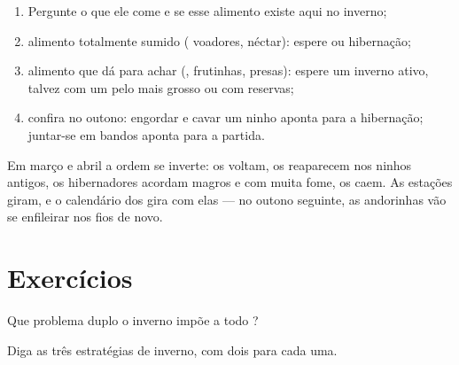 \begin{method}\label{met:g3:animals-through-seasons:guess}
\begin{enumerate}
  \item Pergunte o que ele come e se esse alimento existe aqui no
        inverno;
  \item alimento totalmente sumido ( voadores, néctar):
        espere  ou hibernação;
  \item alimento que dá para achar (, frutinhas, presas):
        espere um inverno ativo, talvez com um pelo mais grosso ou
        com reservas;
  \item confira no outono: engordar e cavar um ninho aponta para a
        hibernação; juntar-se em bandos aponta para a partida.
\end{enumerate}
\end{method}

\begin{example}\label{ex:g3:animals-through-seasons:spring}
Em março e abril a ordem se inverte: os  voltam, os
 reaparecem nos ninhos antigos, os hibernadores acordam
magros e com muita fome, os  caem. As estações
giram, e o calendário dos  gira com elas --- no outono
seguinte, as andorinhas vão se enfileirar nos fios de novo.
\end{example}

\section{Exercícios}

\begin{exercise}[$\star$]\label{exo:g3:animals-through-seasons:1}
Que problema duplo o inverno impõe a todo ?
\end{exercise}

\begin{exercise}[$\star$]\label{exo:g3:animals-through-seasons:2}
Diga as três estratégias de inverno, com dois  para cada uma.
\end{exercise}

